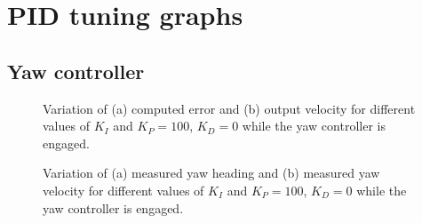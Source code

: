 

\chapter{PID tuning graphs}


\section{Yaw controller}
\label{app:yaw-pid-results}

\begin{figure}[H]
    \begin{minipage}[t]{0.5\linewidth}
        \centering
        \scalebox{0.55}{}
    \end{minipage}
    \begin{minipage}[t]{0.5\linewidth}
        \centering
        \scalebox{0.55}{}
    \end{minipage}
    \caption{Variation of (a) computed error and (b) output velocity for different values of $K_{I}$ and $K_P=100$, $K_D=0$ while the yaw controller is engaged.}
    \label{fig:tune-yaw-int-io}
\end{figure}
\begin{figure}[H]
    \begin{minipage}[t]{0.5\linewidth}
        \centering
        \scalebox{0.55}{}
    \end{minipage}
    \begin{minipage}[t]{0.5\linewidth}
        \centering
        \scalebox{0.55}{}
    \end{minipage}
    \caption{Variation of (a) measured yaw heading and (b) measured yaw velocity for different values of $K_{I}$ and $K_P=100$, $K_D=0$ while the yaw controller is engaged.}
    \label{fig:tune-yaw-int-measures}
\end{figure}

